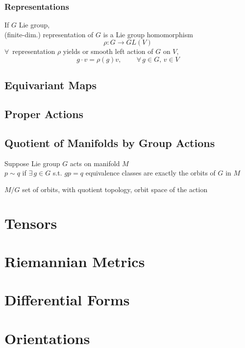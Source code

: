 \documentclass[twoside]{amsart}
\theoremstyle{plain}
\theoremstyle{definition}
\begin{document}
\subsubsection*{Representations}

If $G$ Lie group, \\
(finite-dim.) representation of $G$ is a Lie group homomorphism 
\[
\rho : G \to GL(V)
\]
$\forall \, $ representation $\rho$ yields or smooth left action of $G$ on $V$, 
\[
g\cdot v = \rho(g) v , \quad \quad \, \forall \, g \in G, \, v \in V
\]


\subsection*{Equivariant Maps }

\subsection*{Proper Actions}

\subsection*{Quotient of Manifolds by Group Actions}

Suppose Lie group $G$ acts on manifold $M$ \\
$p\sim q$ if $\exists \, g \in G$ s.t. $gp = q$ \quad equivalence classes are exactly the orbits of $G$ in $M$  

$M/G$ set of orbits, with quotient topology, orbit space of the action





\section{Tensors}




\section{ Riemannian Metrics}



\section{Differential Forms}


\section{Orientations}

\end{document}
